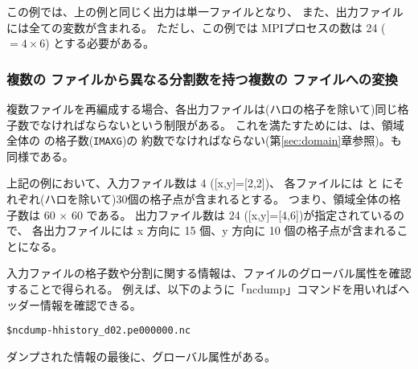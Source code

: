 この例では、上の例と同じく出力は単一ファイルとなり、
また、出力ファイルには全ての変数が含まれる。
ただし、この例では MPIプロセスの数は 24 ($=4\times6$) とする必要がある。


\subsubsection{複数の \scalenetcdf ファイルから異なる分割数を持つ複数の \scalenetcdf ファイルへの変換}
%

複数ファイルを再編成する場合、各出力ファイルは(ハロの格子を除いて)同じ格子数でなければならないという制限がある。
これを満たすためには、は、領域全体の{\XDIR} の格子数(\verb|IMAXG|)の
約数でなければならない(第\ref{sec:domain}章参照)。も同様である。

上記の例において、入力ファイル数は 4 ([x,y]=[2,2])、
各ファイルには{\XDIR} と {\YDIR}にそれぞれ(ハロを除いて)30個の格子点が含まれるとする。
つまり、領域全体の格子数は 60 $\times$ 60 である。
%
出力ファイル数は 24 ([x,y]=[4,6])が指定されているので、
各出力ファイルには x 方向に 15 個、y 方向に 10 個の格子点が含まれることになる。


入力ファイルの格子数や分割に関する情報は、\scalenetcdf ファイルのグローバル属性を確認することで得られる。
例えば、以下のように「ncdump」コマンドを用いればヘッダー情報を確認できる。

\begin{alltt}
  \$  ncdump -h history_d02.pe000000.nc
\end{alltt}

ダンプされた情報の最後に、グローバル属性がある。

